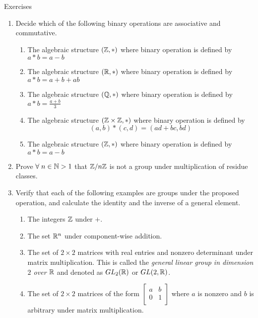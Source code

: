 \begin{xcb}{Exercises}
\begin{enumerate}
	\item Decide which of the following binary operations are associative and commutative.
	\begin{enumerate}
		\item The algebraic structure $(\mathbb Z,*)$ where binary operation is defined by $a*b=a-b$
		\item The algebraic structure $(\mathbb R,*)$ where binary operation is defined by $a*b=a+b+ab$
		\item The algebraic structure $(\mathbb Q,*)$ where binary operation is defined by $a*b=\frac{a+b}{3}$
		\item The algebraic structure $(\mathbb Z\times \mathbb Z,*)$ where binary operation is defined by $$(a,b)*(c,d)=(ad+bc,bd)$$
		\item The algebraic structure $(\mathbb Z,*)$ where binary operation is defined by $a*b=a-b$
	\end{enumerate}
\item Prove  $\forall\; n\in \mathbb N>1$ that $\mathbb Z/n\mathbb Z$ is not a group under multiplication of residue classes.
\item Verify that each of the following examples are groups under the proposed
operation, and calculate the identity and the inverse of a general element.
\begin{enumerate}
	\item{The integers $\mathbb Z$ under $+$.}
		\item{The set $\mathbb R^n$ under component-wise addition.}
	\item{The set of $2\times 2$ matrices with real entries and nonzero determinant under
		matrix multiplication. 
		This is called the {\em general linear group in dimension $2$ over $\mathbb R$} and denoted as $GL_2(\mathbb R)$ or $GL(2,\mathbb R)$}.
	\item{The set of $2\times 2$ matrices of the form $\left[\begin{matrix}
		a & b \\ 0 & 1 \\ \end{matrix}\right]$ where $a$ is nonzero and $b$ is arbitrary under
		matrix multiplication.}
\end{enumerate}
\end{enumerate}
\end{xcb}

